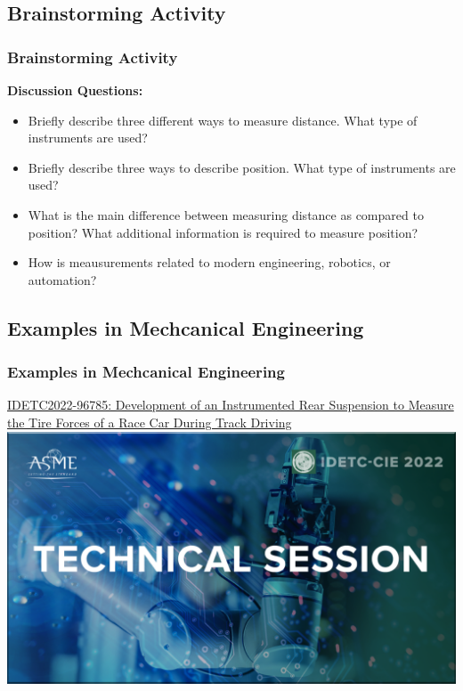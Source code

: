 \documentclass[fleqn]{beamer} %
\newcommand{\sectionIsubsectionIIItitle}{Brainstorming Activity}
\newcommand{\sectionIsubsectionIVtitle}{Examples in Mechcanical Engineering}
\begin{document}
		\subsection{\sectionIsubsectionIIItitle}\label{sectionIsubsectionIII}
			\begin{frame} \scriptsize
				\frametitle{\sectionIsubsectionIIItitle}

			    {\bf Discussion Questions:}	
				\begin{itemize}
					\item Briefly describe three different ways to measure distance. What type of instruments are used?\vspace{10mm}
					\item Briefly describe three ways to describe position. What type of instruments are used?\vspace{10mm}
					\item What is the main difference between measuring distance as compared to position? What additional information is required to measure position? \vspace{4mm}
					\item How is meausurements related to modern engineering, robotics, or automation?\vspace{4mm}
				\end{itemize}

			\end{frame}	

		\subsection{\sectionIsubsectionIVtitle}\label{sectionIsubsectionIV}	

			\begin{frame}
				\frametitle{\sectionIsubsectionIVtitle}
				\href{https://events-platform.asmeconferences.org/event/idetc-cie-2022/planning/UGxhbm5pbmdfOTcxMjI2}{IDETC2022-96785: Development of an Instrumented Rear Suspension to Measure the Tire Forces of a Race Car During Track Driving}\vspace{5mm}\\

				\includegraphics[scale=0.125]{images/IDETC_technical_session.png}

			\end{frame}
\end{document}
